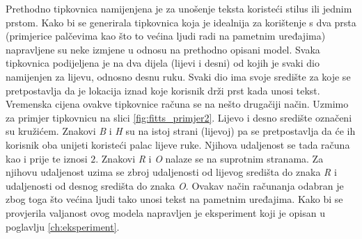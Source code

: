 \documentclass[times, utf8, zavrsni, numeric]{fer}
\begin{document}
Prethodno tipkovnica namijenjena je za unošenje teksta koristeći stilus ili jednim prstom. Kako bi se generirala tipkovnica koja je idealnija za korištenje s dva prsta (primjerice palčevima kao što to većina ljudi radi na pametnim uređajima) napravljene su neke izmjene u odnosu na prethodno opisani model. Svaka tipkovnica podijeljena je na dva dijela (lijevi i desni) od kojih je svaki dio namijenjen za lijevu, odnosno desnu ruku. Svaki dio ima svoje središte za koje se pretpostavlja da je lokacija iznad koje korisnik drži prst kada unosi tekst. Vremenska cijena ovakve tipkovnice računa se na nešto drugačiji način. Uzmimo za primjer tipkovnicu na slici \ref{fig:fitts_primjer2}. Lijevo i desno središte označeni su kružićem. Znakovi \emph{B} i \emph{H} su na istoj strani (lijevoj) pa se pretpostavlja da će ih korisnik oba unijeti koristeći palac lijeve ruke. Njihova udaljenost se tada računa kao i prije te iznosi $2$. Znakovi \emph{R} i \emph{O} nalaze se na suprotnim stranama. Za njihovu udaljenost uzima se zbroj udaljenosti od lijevog središta do znaka \emph{R} i udaljenosti od desnog središta do znaka \emph{O}. Ovakav način računanja odabran je zbog toga što većina ljudi tako unosi tekst na pametnim uređajima. Kako bi se provjerila valjanost ovog modela napravljen je eksperiment koji je opisan u poglavlju \ref{ch:eksperiment}.
\end{document}

